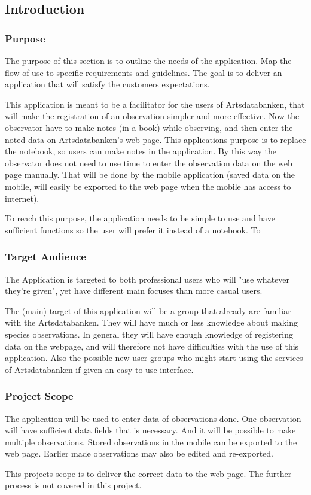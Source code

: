 \subsection{Introduction}
\subsubsection{ Purpose}
	The purpose of this section is to outline the needs of the application. Map the flow of use to specific requirements and guidelines. The goal is to deliver an application that will satisfy the customers expectations.  

This application is meant to be a facilitator for the users of Artsdatabanken, that will make the registration of an observation simpler and more effective. Now the observator have to make notes (in a book) while observing, and then enter the noted data on Artsdatabanken's web page. This applications purpose is to replace the notebook, so users can make notes in the application. By this way the observator does not need to use time to enter the observation data on the web page manually. That will be done by the mobile application (saved data on the mobile, will easily be exported to the web page when the mobile has access to internet). 

To reach this purpose, the application needs to be simple to use and have sufficient functions so the user will prefer it instead of a notebook. 
To  
\subsubsection{ Target Audience}
	The Application is targeted to both professional users who will "use whatever they're given", yet have different main focuses than more casual users.

The (main) target of this application will be a group that already are familiar with the Artsdatabanken. They will have much or less knowledge about making species observations. In general they will have enough knowledge of registering data on the webpage, and will therefore not have difficulties with the use of this application. 
 Also the possible new user groups who might start using the services of Artsdatabanken if given an easy to use interface.


\subsubsection{ Project Scope}
The application will be used to enter data of observations done. One observation will have sufficient data fields that is necessary. And it will be possible to make multiple observations. Stored observations in the mobile can be exported to the web page. Earlier made observations may also be edited and re-exported.

This projects scope is to deliver the correct data to the web page. The further process is not covered in this project.
